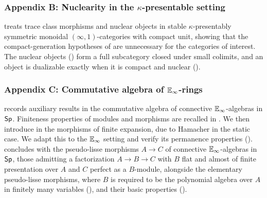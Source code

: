 \subsubsection{Appendix B: Nuclearity in the \texorpdfstring{$\kappa$}{kappa}-presentable setting}\label{subsubsec: intro appendix B}
 treats trace class morphisms and nuclear objects in stable $\kappa$-presentably symmetric monoidal $(\infty,1)$-categories with compact unit, showing that the compact-generation hypotheses of \cite[Lectures VIII \& IX]{Complex} are unnecessary for the categories of interest. The nuclear objects () form a full subcategory closed under small colimits, and an object is dualizable exactly when it is compact and nuclear ().
\subsubsection{Appendix C: Commutative algebra of \texorpdfstring{$\mathbb{E}_{\infty}$}{E-infinity}-rings}\label{subsubsec: intro appendix C}
 records auxiliary results in the commutative algebra of connective $\mathbb{E}_{\infty}$-algebras in $\mathsf{Sp}$. Finiteness properties of modules and morphisms are recalled in . We then introduce in  the morphisms of finite expansion, due to Hamacher \cite{FiniteExpansion} in the static case. We adapt this to the $\mathbb{E}_{\infty}$ setting and verify its permanence properties ().  concludes with the pseudo-lisse morphisms $A\to C$ of connective $\mathbb{E}_{\infty}$-algebras in $\mathsf{Sp}$, those admitting a factorization $A\to B\to C$ with $B$ flat and almost of finite presentation over $A$ and $C$ perfect as a $B$-module, alongside the elementary pseudo-lisse morphisms, where $B$ is required to be the polynomial algebra over $A$ in finitely many variables (), and their basic properties ().
